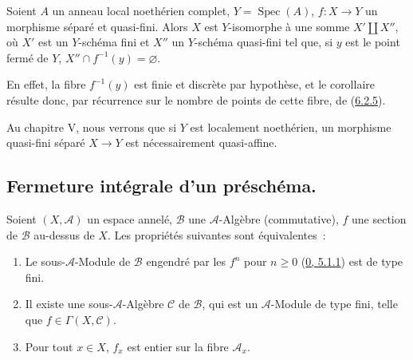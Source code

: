 \begin{corollary}[6.2.6]
\label{II.6.2.6-fr}
Soient $A$ un anneau local noethérien complet, $Y=\operatorname{Spec}(A)$,
$f:X\to Y$ un morphisme séparé et quasi-fini. Alors $X$ est $Y$-isomorphe à
une somme $X'\amalg X''$, où $X'$ est un $Y$-schéma fini et $X''$ un
$Y$-schéma quasi-fini tel que, si $y$ est le point fermé de $Y$,
$X''\cap f^{-1}(y)=\varnothing$.
\end{corollary}

En effet, la fibre $f^{-1}(y)$ est finie et discrète par hypothèse, et le
corollaire résulte donc, par récurrence sur le nombre de points de cette
fibre, de (\hyperref[II.6.2.5-fr]{6.2.5}).

\begin{remark}[6.2.7]
\label{II.6.2.7-fr}
Au chapitre V, nous verrons que si $Y$ est localement noethérien, un morphisme
quasi-fini séparé $X\to Y$ est nécessairement quasi-affine.
\end{remark}

\subsection{Fermeture intégrale d'un préschéma.}
\label{subsection:II.6.3-fr}

\begin{proposition}[6.3.1]
\label{II.6.3.1-fr}
Soient $(X,\mathcal{A})$ un espace annelé, $\mathcal{B}$ une
$\mathcal{A}$-Algèbre (commutative), $f$ une section de $\mathcal{B}$
au-dessus de $X$. Les propriétés suivantes sont équivalentes~:
\begin{enumerate}
\item[a)] Le sous-$\mathcal{A}$-Module de $\mathcal{B}$ engendré par les
$f^n$ pour $n\geq 0$ (\hyperref[0.5.1.1-fr]{0, 5.1.1}) est de type fini.
\item[b)] Il existe une sous-$\mathcal{A}$-Algèbre $\mathcal{C}$ de
$\mathcal{B}$, qui est un $\mathcal{A}$-Module de type fini, telle que
$f\in\Gamma(X,\mathcal{C})$.
\item[c)] Pour tout $x\in X$, $f_x$ est entier sur la fibre
$\mathcal{A}_x$.
\end{enumerate}
\end{proposition}


